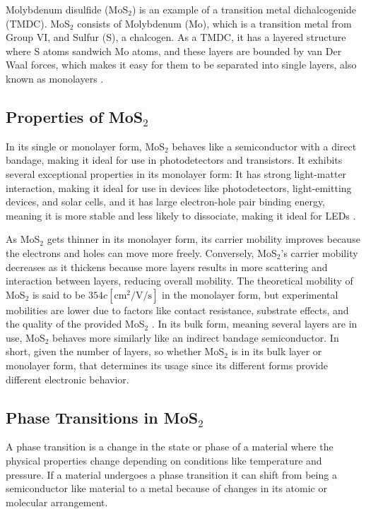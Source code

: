 \documentclass[conference]{IEEEtran}
\begin{document}
Molybdenum disulfide (MoS$_2$) is an example of a transition metal dichalcogenide (TMDC). MoS$_2$ consists of Molybdenum (Mo), which is a transition metal from Group VI, and Sulfur (S), a chalcogen. As a TMDC, it has a layered structure where S atoms sandwich Mo atoms, and these layers are bounded by van Der Waal forces, which makes it easy for them to be separated into single layers, also known as monolayers \cite{oa1}. 

\subsection{Properties of MoS$_2$}

In its single or monolayer form, MoS$_2$ behaves like a semiconductor with a direct bandage, making it ideal for use in photodetectors and transistors. It exhibits several exceptional properties in its monolayer form: It has strong light-matter interaction, making it ideal for use in devices like photodetectors, light-emitting devices, and solar cells, and it has large electron-hole pair binding energy, meaning it is more stable and less likely to dissociate, making it ideal for LEDs \cite{oa2}.

As MoS$_2$ gets thinner in its monolayer form, its carrier mobility improves because the electrons and holes can move more freely. Conversely, MoS$_2$'s carrier mobility decreases as it thickens because more layers results in more scattering and interaction between layers, reducing overall mobility. The theoretical mobility of MoS$_2$ is said to be $354c[\si{\centi\meter\squared\per\volt\per\second}]$ in the monolayer form, but experimental mobilities are lower due to factors like contact resistance, substrate effects, and the quality of the provided MoS$_2$ \cite{oa3}. In its bulk form, meaning several layers are in use, MoS$_2$ behaves more similarly like an indirect bandage semiconductor. In short, given the number of layers, so whether MoS$_2$ is in its bulk layer or monolayer form, that determines its usage since its different forms provide different electronic behavior. 

\subsection{Phase Transitions in MoS$_2$}

A phase transition is a change in the state or phase of a material where the physical properties change depending on conditions like temperature and pressure. If a material undergoes a phase transition it can shift from being a semiconductor like material to a metal because of changes in its atomic or molecular arrangement. 
\end{document}
